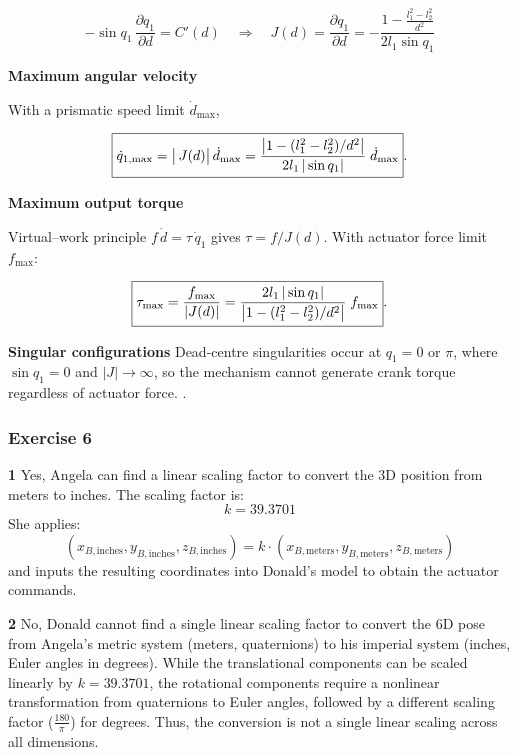 \documentclass[12pt,a4paper]{article}
\begin{document}
\[
-\sin q_{1}\,\frac{\partial q_{1}}{\partial d}=C'(d)
\quad\Longrightarrow\quad
%
J(d)=\frac{\partial q_{1}}{\partial d}
     =-\frac{1-\displaystyle\frac{l_{1}^{2}-l_{2}^{2}}{d^{2}}}
            {2l_{1}\sin q_{1}}
\]

\textbf{Maximum angular velocity}

With a prismatic speed limit \(\dot d_{\max}\),

\[
\boxed{%
\dot q_{1,\max}
      =\bigl|\,J(d)\bigr|\,\dot d_{\max}
      =\frac{\bigl|1-(l_{1}^{2}-l_{2}^{2})/d^{2}\bigr|}
             {2l_{1}\,|\sin q_{1}|}\;\dot d_{\max}}.
\]

\textbf{Maximum output torque}

Virtual–work principle \(f\,\dot d=\tau\,\dot q_{1}\) gives
\(\tau =f/J(d)\).  With actuator force limit \(f_{\max}\):

\[
\boxed{%
\tau_{\max}
      =\frac{f_{\max}}{|J(d)|}
      =\frac{2l_{1}\,|\sin q_{1}|}
             {\bigl|1-(l_{1}^{2}-l_{2}^{2})/d^{2}\bigr|}\;f_{\max}}.
\]




\textbf{Singular configurations}
Dead-centre singularities occur at \(q_{1}=0\) or \(\pi\),
where \(\sin q_{1}=0\) and \(|J|\to\infty\), so the mechanism cannot
generate crank torque regardless of actuator force. \cite{Spong2006}.





\subsubsection*{Exercise 6}
\textbf{1} Yes, Angela can find a linear scaling factor to convert the 3D position from meters to inches. The scaling factor is: 
$$k = 39.3701$$
She applies:
$$(x_{B,\text{inches}}, y_{B,\text{inches}}, z_{B,\text{inches}}) = k \cdot (x_{B,\text{meters}}, y_{B,\text{meters}}, z_{B,\text{meters}})$$
and inputs the resulting coordinates into Donald’s model to obtain the actuator commands.

\textbf{2} No, Donald cannot find a single linear scaling factor to convert the 6D pose from Angela’s metric system (meters, quaternions) to his imperial system (inches, Euler angles in degrees). While the translational components can be scaled linearly by $ k = 39.3701 $, the rotational components require a nonlinear transformation from quaternions to Euler angles, followed by a different scaling factor ($ \frac{180}{\pi} $) for degrees. Thus, the conversion is not a single linear scaling across all dimensions.
\end{document}
